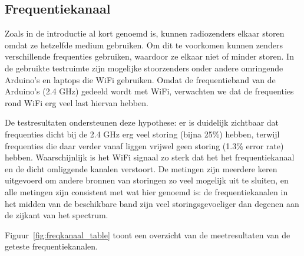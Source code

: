 \documentclass[a4paper,10pt]{article}
\begin{document}
\subsection{Frequentiekanaal}
Zoals in de introductie al kort genoemd is, kunnen radiozenders elkaar storen omdat ze hetzelfde medium gebruiken. Om dit te voorkomen kunnen zenders verschillende frequenties gebruiken, waardoor ze elkaar niet of minder storen. In de gebruikte testruimte zijn mogelijke stoorzenders onder andere omringende Arduino's en laptops die WiFi gebruiken. Omdat de frequentieband van de Arduino's (2.4 GHz) gedeeld wordt met WiFi, verwachten we dat de frequenties rond WiFi erg veel last hiervan hebben.

De testresultaten ondersteunen deze hypothese: er is duidelijk zichtbaar dat frequenties dicht bij de 2.4 GHz erg veel storing (bijna 25\%) hebben, terwijl frequenties die daar verder vanaf liggen vrijwel geen storing (1.3\% error rate) hebben. 
Waarschijnlijk is het WiFi signaal zo sterk dat het het frequentiekanaal en de dicht omliggende kanalen verstoort.
De metingen zijn meerdere keren uitgevoerd om andere bronnen van storingen zo veel mogelijk uit te sluiten, en alle metingen zijn consistent met wat hier genoemd is: de frequentiekanalen in het midden van de beschikbare band zijn veel storingsgevoeliger dan degenen aan de zijkant van het spectrum.

Figuur~\ref{fig:freqkanaal_table} toont een overzicht van de meetresultaten van de geteste frequentiekanalen.
\end{document}
